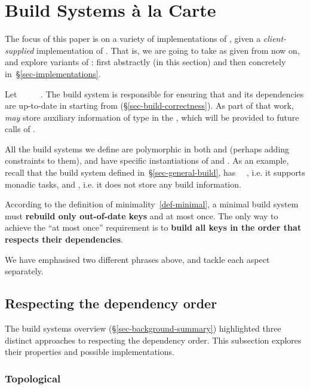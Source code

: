 \section{Build Systems \`a la Carte}\label{sec-build}

The focus of this paper is on a variety of implementations of , given
a \emph{client-supplied} implementation of . That is, we are going to take
 as given from now on, and explore variants of : first
abstractly (in this section) and then concretely in~\S\ref{sec-implementations}.

Let ~\hs{=}~~~~. The build
system  is responsible for ensuring that  and its dependencies
are up-to-date in  starting from  (\S\ref{sec-build-correctness}). As part of that work,
 \emph{may} store auxiliary information  of type  in
the , which will be provided to future calls of .

All the build systems we define are polymorphic in both  and 
(perhaps adding constraints to them), and have specific instantiations of 
and . As an example, recall that the  build system defined
in~\S\ref{sec-general-build}, has ~\hs{=}~, i.e. it supports
monadic tasks, and , i.e. it does not store any build information.

According to the definition of minimality~\ref{def-minimal}, a minimal build
system must \textbf{rebuild only out-of-date keys} and at most once. The only
way to achieve the ``at most once'' requirement is to \textbf{build all keys in
the order that respects their dependencies}.

We have emphasised two different phrases above, and tackle each aspect separately.

\subsection{Respecting the dependency order}
\label{sec-dependency-orderings}

The build systems overview (\S\ref{sec-background-summary}) highlighted three
distinct approaches to respecting the dependency order. This subsection explores
their properties and possible implementations.

\subsubsection{Topological}

